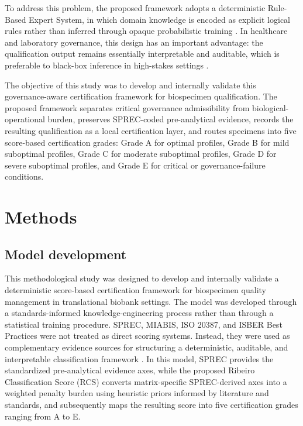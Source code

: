 \documentclass[preprint,12pt]{elsarticle}
\begin{document}
To address this problem, the proposed framework adopts a deterministic Rule-Based Expert System, in which domain knowledge is encoded as explicit 
logical rules rather than inferred through opaque probabilistic training \cite{shortliffe2014,russell2021}. In healthcare and laboratory 
governance, this design has an important advantage: the qualification output remains essentially interpretable and auditable, which is preferable 
to black-box inference in high-stakes settings \cite{rudin2019stop}.

The objective of this study was to develop and internally validate this governance-aware certification framework for biospecimen qualification. 
The proposed framework separates critical governance admissibility from biological-operational burden, preserves SPREC-coded pre-analytical 
evidence, records the resulting qualification as a local certification layer, and routes specimens into five score-based certification grades: 
Grade A for optimal profiles, Grade B for mild suboptimal profiles, Grade C for moderate suboptimal profiles, Grade D for severe suboptimal 
profiles, and Grade E for critical or governance-failure conditions.

\section{Methods}\label{sec:methods}

\subsection{Model development}\label{subsec:model_development}

This methodological study was designed to develop and internally validate a deterministic score-based certification framework for biospecimen 
quality management in translational biobank settings. The model was developed through a standards-informed knowledge-engineering process rather 
than through a statistical training procedure. SPREC, MIABIS, ISO 20387, and ISBER Best Practices were not treated as direct scoring systems. 
Instead, they were used as complementary evidence sources for structuring a deterministic, auditable, and interpretable classification framework 
\cite{betsou2010,lehmann2012,norlin2012,merinomartinez2016,campbell2018,iso20387}. In this model, SPREC provides the standardized 
pre-analytical evidence axes, while the proposed Ribeiro Classification Score (RCS) converts matrix-specific SPREC-derived axes into 
a weighted penalty burden using heuristic priors informed by literature and standards, and subsequently maps the resulting score 
into five certification grades ranging from A to E.
\end{document}
